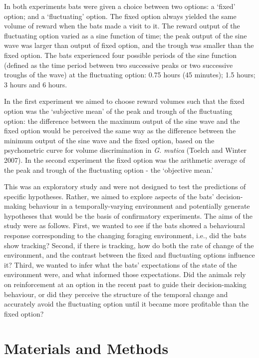 \documentclass[
]{article}
\begin{document}
In both experiments bats were given a choice between two options: a `fixed' option; and a `fluctuating' option. The fixed option always yielded the same volume of reward when the bats made a visit to it. The reward output of the fluctuating option varied as a sine function of time; the peak output of the sine wave was larger than output of fixed option, and the trough was smaller than the fixed option. The bats experienced four possible periods of the sine function (defined as the time period between two successive peaks or two successive troughs of the wave) at the fluctuating option: 0.75 hours (45 minutes); 1.5 hours; 3 hours and 6 hours.

In the first experiment we aimed to choose reward volumes such that the fixed option was the `subjective mean' of the peak and trough of the fluctuating option: the difference between the maximum output of the sine wave and the fixed option would be perceived the same way as the difference between the minimum output of the sine wave and the fixed option, based on the psychometric curve for volume discrimination in \emph{G. mutica} (Toelch and Winter 2007). In the second experiment the fixed option was the arithmetic average of the peak and trough of the fluctuating option - the `objective mean.'

This was an exploratory study and were not designed to test the predictions of specific hypotheses. Rather, we aimed to explore aspects of the bats' decision-making behaviour in a temporally-varying environment and potentially generate hypotheses that would be the basis of confirmatory experiments. The aims of the study were as follows. First, we wanted to see if the bats showed a behavioural response corresponding to the changing foraging environment, i.e., did the bats show tracking? Second, if there is tracking, how do both the rate of change of the environment, and the contrast between the fixed and fluctuating options influence it? Third, we wanted to infer what the bats' expectations of the state of the environment were, and what informed those expectations. Did the animals rely on reinforcement at an option in the recent past to guide their decision-making behaviour, or did they perceive the structure of the temporal change and accurately avoid the fluctuating option until it became more profitable than the fixed option?

\hypertarget{materials-and-methods}{%
\section{Materials and Methods}\label{materials-and-methods}}
\end{document}
